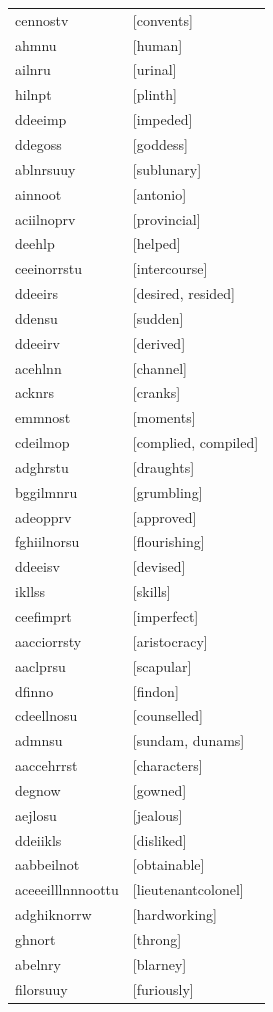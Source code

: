 \documentclass{article}
\begin{document}
\begin{tabular}{ll}
cennostv & [convents] \\
ahmnu & [human] \\
ailnru & [urinal] \\
hilnpt & [plinth] \\
ddeeimp & [impeded] \\
ddegoss & [goddess] \\
ablnrsuuy & [sublunary] \\
ainnoot & [antonio] \\
aciilnoprv & [provincial] \\
deehlp & [helped] \\
ceeinorrstu & [intercourse] \\
ddeeirs & [desired, resided] \\
ddensu & [sudden] \\
ddeeirv & [derived] \\
acehlnn & [channel] \\
acknrs & [cranks] \\
emmnost & [moments] \\
cdeilmop & [complied, compiled] \\
adghrstu & [draughts] \\
bggilmnru & [grumbling] \\
adeopprv & [approved] \\
fghiilnorsu & [flourishing] \\
ddeeisv & [devised] \\
ikllss & [skills] \\
ceefimprt & [imperfect] \\
aacciorrsty & [aristocracy] \\
aaclprsu & [scapular] \\
dfinno & [findon] \\
cdeellnosu & [counselled] \\
admnsu & [sundam, dunams] \\
aaccehrrst & [characters] \\
degnow & [gowned] \\
aejlosu & [jealous] \\
ddeiikls & [disliked] \\
aabbeilnot & [obtainable] \\
aceeeilllnnnoottu & [lieutenantcolonel] \\
adghiknorrw & [hardworking] \\
ghnort & [throng] \\
abelnry & [blarney] \\
filorsuuy & [furiously] \\

\end{tabular}
\end{document}
